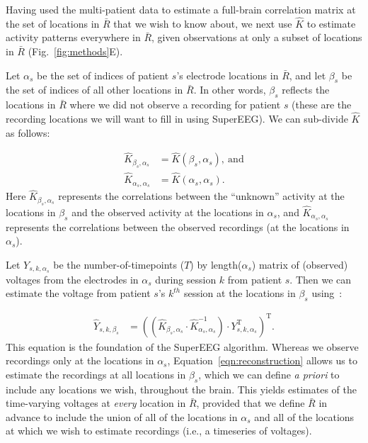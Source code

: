 \documentclass[11pt]{article}
\begin{document}
Having used the multi-patient data to estimate a full-brain
correlation matrix at the set of locations in $\bar{R}$ that we wish
to know about, we next use $\hat{K}$ to estimate activity patterns
everywhere in $\bar{R}$, given observations at only a subset of
locations in $\bar{R}$ (Fig.~\ref{fig:methods}E).

Let $\alpha_s$ be the set of indices of patient $s$'s electrode locations in
$\bar{R}$, and let $\beta_s$ be the set of indices of all other
locations in $\bar{R}$. In other words, $\beta_s$ reflects the locations
in $\bar{R}$ where we did not observe a recording for patient $s$
(these are the recording locations we will want to fill in using SuperEEG).
We can sub-divide $\hat{K}$ as follows:

\begin{align}
\hat{K}_{\beta_s,\alpha_s} &= \hat{K}(\beta_s,\alpha_s),~\mathrm{and}\label{eqn:Kba}\\
\hat{K}_{\alpha_s,\alpha_s} &= \hat{K}(\alpha_s,\alpha_s)\label{eqn:Kaa}.
\end{align}
Here $\hat{K}_{\beta_s, \alpha_s}$ represents the correlations between
the ``unknown'' activity at the locations in $\beta_s$ and the
observed activity at the locations in $\alpha_s$, and
$\hat{K}_{\alpha_s, \alpha_s}$ represents the correlations between the
observed recordings (at the locations in $\alpha_s$).

Let $Y_{s,k,\alpha_s}$ be the number-of-timepoints ($T$) by
length($\alpha_s$) matrix of (observed) voltages from the electrodes in
$\alpha_s$ during session $k$ from patient $s$. Then we can estimate the
voltage from patient $s$'s $k^{th}$ session at the locations in
$\beta_s$ using~\cite{Rasm06}:

\begin{align}
\hat{Y}_{s,k,\beta_s} &= ((\hat{K}_{\beta_s,\alpha_s}\cdot\hat{K}_{\alpha_s,\alpha_s}^{-1})\cdot Y_{s,k,\alpha_s}^\mathrm{T})^\mathrm{T}.\label{eqn:reconstruction}
\end{align}
This equation is the foundation of the SuperEEG algorithm.  Whereas we
observe recordings only at the locations in $\alpha_s$,
Equation~\ref{eqn:reconstruction} allows us to estimate the recordings
at all locations in $\beta_s$, which we can define \textit{a priori}
to include any locations we wish, throughout the brain.  This yields
estimates of the time-varying voltages at \textit{every} location in
$\bar{R}$, provided that we define $\bar{R}$ in advance to include the
union of all of the locations in $\alpha_s$ and all of the locations
at which we wish to estimate recordings (i.e., a timeseries of
voltages).
\end{document}
